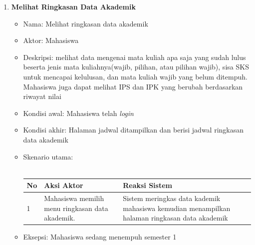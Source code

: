 \begin{enumerate}
	\item \textbf{Melihat Ringkasan Data Akademik}
		\begin{itemize}
			\item Nama: Melihat ringkasan data akademik
			\item Aktor: Mahasiswa
			\item Deskripsi: melihat data mengenai mata kuliah apa saja yang sudah lulus beserta jenis mata kuliahnya(wajib, pilihan, atau pilihan wajib), sisa SKS untuk mencapai kelulusan, dan mata kuliah wajib yang belum ditempuh. Mahasiswa juga dapat melihat IPS dan IPK yang berubah berdasarkan riwayat nilai
			\item Kondisi awal: Mahasiswa telah \textit{login}
			\item Kondisi akhir: Halaman jadwal ditampilkan dan berisi jadwal ringkasan data akademik
			\item Skenario utama: \\ \\
			\begin{tabular}{|p{0.5cm} |p{6cm}| p{6cm}|}
						\hline
							No 	& Aksi Aktor & Reaksi Sistem \\ \hline
							1 	& Mahasiswa memilih menu ringkasan data akademik. 	&	Sistem meringkas data kademik mahasiswa kemudian menampilkan halaman ringkasan data akademik \\ \hline 
						\end{tabular} 
			\item Eksepsi: Mahasiswa sedang menempuh semester 1
		\end{itemize}
\end{enumerate}

